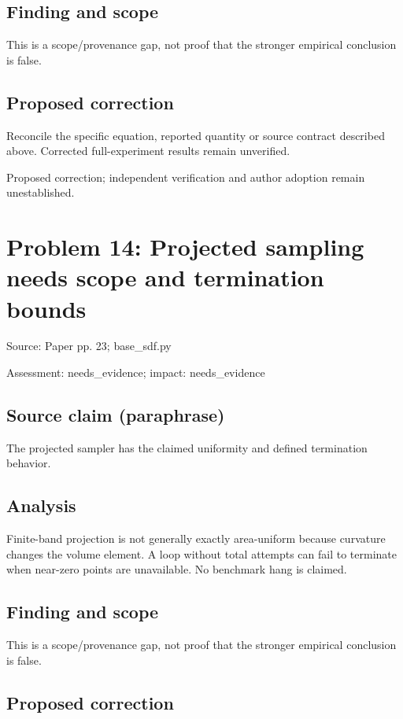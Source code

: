 \documentclass[11pt]{article}
\begin{document}
\subsection*{Finding and scope}

This is a scope/provenance gap, not proof that the stronger empirical conclusion is false.

\subsection*{Proposed correction}

Reconcile the specific equation, reported quantity or source contract described above. Corrected full-experiment results remain unverified.

Proposed correction; independent verification and author adoption remain unestablished.

\section*{Problem 14: Projected sampling needs scope and termination bounds}

Source: Paper pp. 23; base\_sdf.py

Assessment: needs\_evidence; impact: needs\_evidence

\subsection*{Source claim (paraphrase)}

The projected sampler has the claimed uniformity and defined termination behavior.

\subsection*{Analysis}

Finite-band projection is not generally exactly area-uniform because curvature changes the volume element. A loop without total attempts can fail to terminate when near-zero points are unavailable. No benchmark hang is claimed.

\subsection*{Finding and scope}

This is a scope/provenance gap, not proof that the stronger empirical conclusion is false.

\subsection*{Proposed correction}
\end{document}
